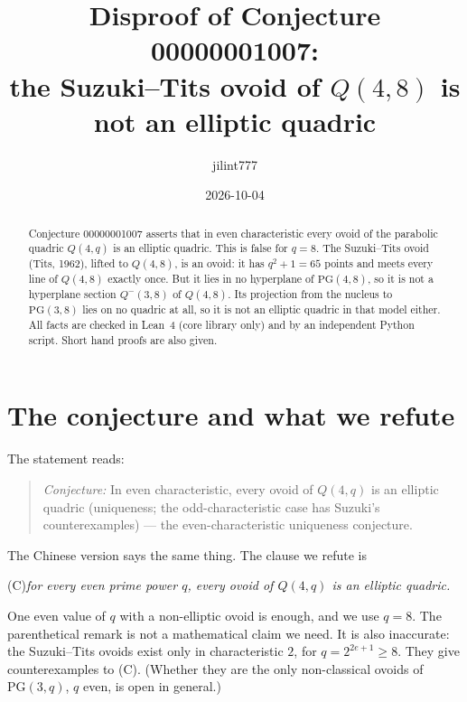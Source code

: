 \documentclass[11pt]{article}
\title{Disproof of Conjecture 00000001007:\\
the Suzuki--Tits ovoid of $Q(4,8)$ is not an elliptic quadric}
\author{jilint777}
\date{2026-10-04}
\theoremstyle{definition}
\theoremstyle{remark}
\begin{document}
\sloppy
\maketitle

\begin{abstract}
Conjecture 00000001007 asserts that in even characteristic every ovoid of the
parabolic quadric $Q(4,q)$ is an elliptic quadric. This is false for $q=8$.
The Suzuki--Tits ovoid (Tits, 1962), lifted to $Q(4,8)$, is an ovoid: it has
$q^2+1=65$ points and meets every line of $Q(4,8)$ exactly once. But it lies in
no hyperplane of $\mathrm{PG}(4,8)$, so it is not a hyperplane section
$Q^-(3,8)$ of $Q(4,8)$. Its projection from the nucleus to $\mathrm{PG}(3,8)$
lies on no quadric at all, so it is not an elliptic quadric in that model
either. All facts are checked in Lean~4 (core library only) and by an
independent Python script. Short hand proofs are also given.
\end{abstract}

\section{The conjecture and what we refute}
The statement reads:
\begin{quote}
\emph{Conjecture:} In even characteristic, every ovoid of $Q(4,q)$ is an
elliptic quadric (uniqueness; the odd-characteristic case has Suzuki's
counterexamples) --- the even-characteristic uniqueness conjecture.
\end{quote}
The Chinese version says the same thing. The clause we refute is
\begin{center}
(C)\quad \emph{for every even prime power $q$, every ovoid of $Q(4,q)$ is an
elliptic quadric.}
\end{center}
One even value of $q$ with a non-elliptic ovoid is enough, and we use $q=8$.
The parenthetical remark is not a mathematical claim we need. It is also
inaccurate: the Suzuki--Tits ovoids exist only in characteristic $2$, for
$q=2^{2e+1}\ge 8$. They give counterexamples to (C). (Whether they are the only non-classical
ovoids of $\mathrm{PG}(3,q)$, $q$ even, is open in general.)
\end{document}
